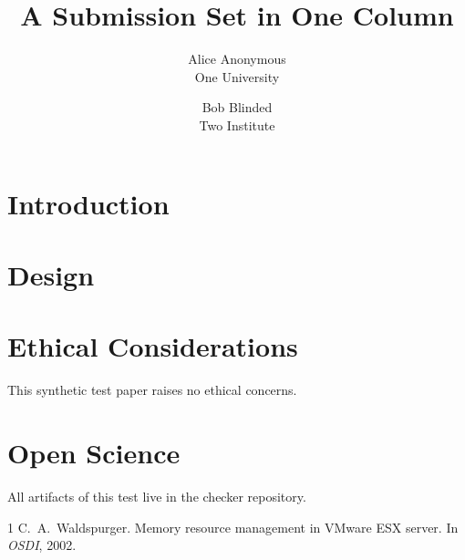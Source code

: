 \documentclass[letterpaper,twocolumn,10pt]{article}
\date{}
\title{\Large \bf A Submission Set in One Column}
\author{{\rm Alice Anonymous}\\One University \and {\rm Bob Blinded}\\Two Institute}
\begin{document}
\maketitle
\onecolumn

\begin{abstract}
\lipsum[1][1-5]
\end{abstract}

\section{Introduction}
\lipsum[2-4]

\section{Design}
\lipsum[5-7]

\appendix
\section*{Ethical Considerations}
This synthetic test paper raises no ethical concerns.

\section*{Open Science}
All artifacts of this test live in the checker repository.

\begin{thebibliography}{1}
 C.~A.\ Waldspurger. Memory resource management in VMware ESX
  server. In \emph{OSDI}, 2002.
\end{thebibliography}
\end{document}
